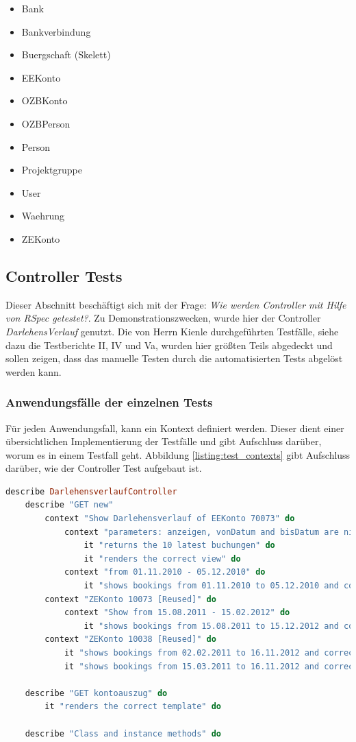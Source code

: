 \documentclass[12pt,             %
               a4paper,          %
               listof=totoc,     %
               index=totoc,      %
               bibliography=totoc,%
               oneside,         %
               BCOR1cm,          %
               english   %
               ]{scrbook}
\begin{document}
\begin{itemize}
     \item{Bank}
     \item{Bankverbindung}
     \item{Buergschaft (Skelett)}
     \item{EEKonto}
     \item{OZBKonto}
     \item{OZBPerson}
     \item{Person}
     \item{Projektgruppe}
     \item{User}
     \item{Waehrung}
     \item{ZEKonto}
\end{itemize}

\subsection{Controller Tests}
Dieser Abschnitt beschäftigt sich mit der Frage: \textit{Wie werden Controller mit Hilfe von RSpec getestet?}. Zu Demonstrationszwecken, wurde hier der Controller \textit{DarlehensVerlauf} genutzt. Die von Herrn Kienle durchgeführten Testfälle, siehe dazu die Testberichte II, IV und Va,   wurden hier größten Teils abgedeckt und sollen zeigen, dass das manuelle Testen durch die automatisierten Tests abgelöst werden kann.


\subsubsection{Anwendungsfälle der einzelnen Tests}
Für jeden Anwendungsfall, kann ein Kontext definiert werden. Dieser dient einer übersichtlichen Implementierung der Testfälle und gibt Aufschluss darüber, worum es in einem Testfall geht. Abbildung \vref{listing:test_contexts} gibt Aufschluss darüber, wie der Controller Test aufgebaut ist.\\

\begin{lstlisting}[language=Ruby, frame=single, caption=Aufbau Controller Test Darlehensverlauf, tabsize=2, flexiblecolumns=true, captionpos=b]
describe DarlehensverlaufController
	describe "GET new"
		context "Show Darlehensverlauf of EEKonto 70073" do
			context "parameters: anzeigen, vonDatum and bisDatum are nil" do
				it "returns the 10 latest buchungen" do
				it "renders the correct view" do
			context "from 01.11.2010 - 05.12.2010" do
				it "shows bookings from 01.11.2010 to 05.12.2010 and correct points and saldi" do
		context "ZEKonto 10073 [Reused]" do
			context "Show from 15.08.2011 - 15.02.2012" do
				it "shows bookings from 15.08.2011 to 15.12.2012 and correct points and saldi" do
		context "ZEKonto 10038 [Reused]" do
			it "shows bookings from 02.02.2011 to 16.11.2012 and correct points and saldi" do
			it "shows bookings from 15.03.2011 to 16.11.2012 and correct points and saldi" do
		
	describe "GET kontoauszug" do
		it "renders the correct template" do

	describe "Class and instance methods" do
\end{lstlisting}\label{listing:test_contexts}
\end{document}
